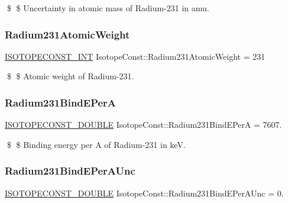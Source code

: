 \$ \$ Uncertainty in atomic mass of Radium-\/231 in amu. \mbox{\label{group___isotope_const-_radium-_ra231_ga9afd4dce3e351ad7b33482999f1a4963}} 
\subsubsection{\texorpdfstring{Radium231\+Atomic\+Weight}{Radium231AtomicWeight}}
{\footnotesize\ttfamily \mbox{\hyperlink{group___isotope_const-_macros_ga5f18360b3e99483a35c32d789e62621c}{I\+S\+O\+T\+O\+P\+E\+C\+O\+N\+S\+T\+\_\+\+I\+NT}} Isotope\+Const\+::\+Radium231\+Atomic\+Weight = 231}

\$ \$ Atomic weight of Radium-\/231. \mbox{\label{group___isotope_const-_radium-_ra231_ga284cdcb1afc30ff52983f2310fa7c6c4}} 
\subsubsection{\texorpdfstring{Radium231\+Bind\+E\+PerA}{Radium231BindEPerA}}
{\footnotesize\ttfamily \mbox{\hyperlink{group___isotope_const-_macros_ga8f45a7272ce02c0b4c65c44636ed719a}{I\+S\+O\+T\+O\+P\+E\+C\+O\+N\+S\+T\+\_\+\+D\+O\+U\+B\+LE}} Isotope\+Const\+::\+Radium231\+Bind\+E\+PerA = 7607.}

\$ \$ Binding energy per A of Radium-\/231 in keV. \mbox{\label{group___isotope_const-_radium-_ra231_gaa9e1d1b3c456828a222b9964e215cb31}} 
\subsubsection{\texorpdfstring{Radium231\+Bind\+E\+Per\+A\+Unc}{Radium231BindEPerAUnc}}
{\footnotesize\ttfamily \mbox{\hyperlink{group___isotope_const-_macros_ga8f45a7272ce02c0b4c65c44636ed719a}{I\+S\+O\+T\+O\+P\+E\+C\+O\+N\+S\+T\+\_\+\+D\+O\+U\+B\+LE}} Isotope\+Const\+::\+Radium231\+Bind\+E\+Per\+A\+Unc = 0.}

